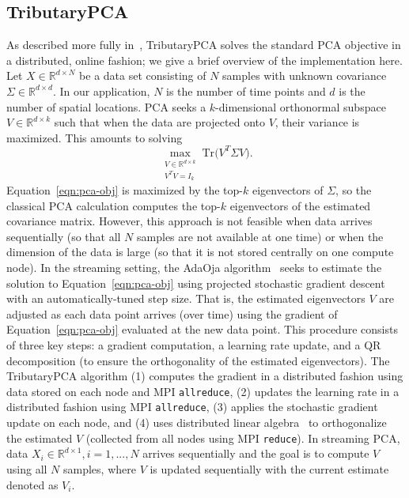 \documentclass{juliacon}
\begin{document}
\subsection{TributaryPCA} 
As described more fully in~\cite{wang2021tributarypca}, TributaryPCA solves the standard PCA objective in a distributed, online fashion; we give a brief overview of the implementation here.
Let $X \in \mathbb{R}^{d \times N}$ be a data set consisting of $N$ samples with unknown covariance $\Sigma \in \mathbb{R}^{d \times d}$. 
In our application, $N$ is the number of time points and $d$ is the number of spatial locations.
PCA seeks a $k$-dimensional orthonormal subspace $V \in \mathbb{R}^{d \times k}$ such that when the data are projected onto $V$, their variance is maximized. This amounts to solving 
\begin{equation}\label{eqn:pca-obj}
    \max_{\substack{V \in \mathbb{R}^{d \times k} \\ V^TV = I_k}} \text{Tr}\Big(V^T \Sigma V\Big).
\end{equation}
Equation~\eqref{eqn:pca-obj} is maximized by the top-$k$ eigenvectors of $\Sigma$, so the classical PCA calculation computes the top-$k$ eigenvectors of the estimated covariance matrix.
However, this approach is not feasible when data arrives sequentially (so that all $N$ samples are not available at one time) or when the dimension of the data is large (so that it is not stored centrally on one compute node).
In the streaming setting, the AdaOja algorithm~\cite{henriksen2019adaoja} seeks to estimate the solution to Equation~\eqref{eqn:pca-obj} using projected stochastic gradient descent with an automatically-tuned step size.
That is, the estimated eigenvectors $V$ are adjusted as each data point arrives (over time) using the gradient of Equation~\eqref{eqn:pca-obj} evaluated at the new data point.
This procedure consists of three key steps: a gradient computation, a learning rate update, and a QR decomposition (to ensure the orthogonality of the estimated eigenvectors).
The TributaryPCA algorithm (1) computes the gradient in a distributed fashion using data stored on each node and MPI \texttt{allreduce}, (2) updates the learning rate in a distributed fashion using MPI \texttt{allreduce}, (3) applies the stochastic gradient update on each node, and (4) uses distributed linear algebra~\cite{demmel2012communication} to orthogonalize the estimated $V$ (collected from all nodes using MPI \texttt{reduce}).
In streaming PCA, data $X_i \in \mathbb{R}^{d \times 1}, i=1,...,N$ arrives sequentially and the goal is to compute $V$ using all $N$ samples, where $V$ is updated sequentially with the current estimate denoted as $V_i$. 
\end{document}
